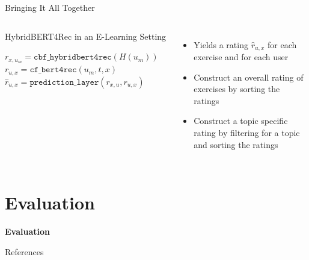 \documentclass[en]{sdqbeamer}
\begin{document}
\begin{frame}{Bringing It All Together}
	\begin{columns}
		\begin{algorithm}[H]
			\caption{HybridBERT4Rec in an E-Learning Setting}
			\begin{algorithmic}[1]
					\State $r_{x,u_m} = \texttt{cbf\_hybridbert4rec}(H(u_m))$
						\State $r_{u, x} = \texttt{cf\_bert4rec}(u_m,t,x)$
						\State $\hat{r}_{u,x} = \texttt{prediction\_layer}(r_{x,u}, r_{u,x})$
					\EndFor
				\EndFor
			\end{algorithmic}
		\end{algorithm}
		\begin{itemize}
			\item Yields a rating $\hat{r}_{u,x}$ for each exercise and for each user
			\item Construct an overall rating of exercises by sorting the ratings
			\item Construct a topic specific rating by filtering for a topic and sorting the ratings
		\end{itemize}
	\end{columns}
\end{frame}

\section{Evaluation}
\begin{frame}
	\centering\textbf{\LARGE{Evaluation}}
\end{frame}

\appendix
\beginbackup
\begin{frame}{References}
	\printbibliography
\end{frame}

\backupend
\end{document}
